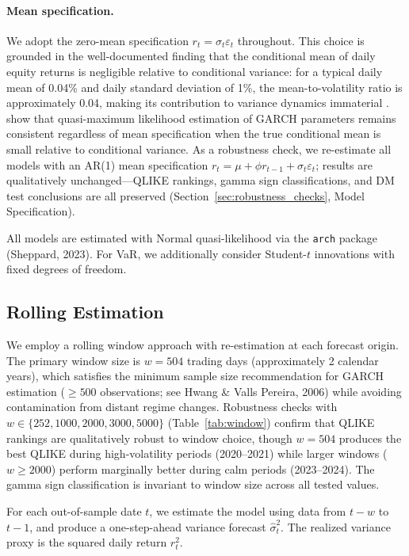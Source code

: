 \paragraph{Mean specification.}
We adopt the zero-mean specification $r_t = \sigma_t \varepsilon_t$ throughout. This choice is grounded in the well-documented finding that the conditional mean of daily equity returns is negligible relative to conditional variance: for a typical daily mean of 0.04\% and daily standard deviation of 1\%, the mean-to-volatility ratio is approximately 0.04, making its contribution to variance dynamics immaterial \citep{bollerslev1986,hansen2005}. \citet{francq2004} show that quasi-maximum likelihood estimation of GARCH parameters remains consistent regardless of mean specification when the true conditional mean is small relative to conditional variance. As a robustness check, we re-estimate all models with an AR(1) mean specification $r_t = \mu + \phi r_{t-1} + \sigma_t \varepsilon_t$; results are qualitatively unchanged---QLIKE rankings, gamma sign classifications, and DM test conclusions are all preserved (Section~\ref{sec:robustness_checks}, Model Specification).

All models are estimated with Normal quasi-likelihood via the \texttt{arch} package (Sheppard, 2023). For VaR, we additionally consider Student-$t$ innovations with fixed degrees of freedom.

\subsection{Rolling Estimation}

We employ a rolling window approach with re-estimation at each forecast origin. The primary window size is $w = 504$ trading days (approximately 2 calendar years), which satisfies the minimum sample size recommendation for GARCH estimation ($\geq 500$ observations; see Hwang \& Valls Pereira, 2006) while avoiding contamination from distant regime changes. Robustness checks with $w \in \{252, 1000, 2000, 3000, 5000\}$ (Table~\ref{tab:window}) confirm that QLIKE rankings are qualitatively robust to window choice, though $w = 504$ produces the best QLIKE during high-volatility periods (2020--2021) while larger windows ($w \geq 2000$) perform marginally better during calm periods (2023--2024). The gamma sign classification is invariant to window size across all tested values.

For each out-of-sample date $t$, we estimate the model using data from $t-w$ to $t-1$, and produce a one-step-ahead variance forecast $\hat{\sigma}^2_t$. The realized variance proxy is the squared daily return $r^2_t$.


